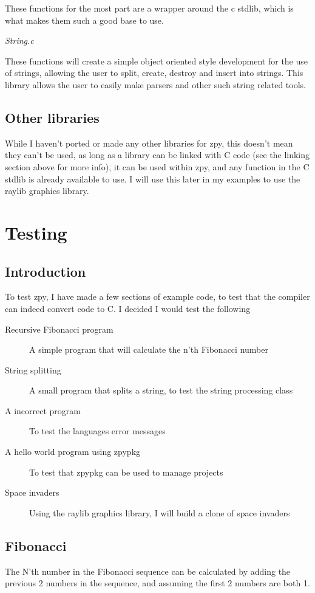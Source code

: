 \documentclass[a4paper,12pt]{article}
\begin{document}
{These functions for the most part are a wrapper around the c stdlib, which is what makes them such a good base to use.


\textit{String.c}

These functions will create a simple object oriented style development for the use of strings, allowing the user to split, create,
destroy and insert into strings. This library allows the user to easily make parsers and other such string related tools.

\subsection{Other libraries}
While I haven't ported or made any other libraries for zpy, this doesn't mean they can't be used, as long as a library can be linked
with C code (see the linking section above for more info), it can be used within zpy, and any function in the C stdlib is already
available to use. I will use this later in my examples to use the raylib graphics library.

\section{Testing}
\subsection{Introduction}
To test zpy, I have made a few sections of example code, to test that the compiler can indeed convert code to C. I decided I would
test the following
\begin{description}
	\item[Recursive Fibonacci program] A simple program that will calculate the n'th Fibonacci number
	\item[String splitting] A small program that splits a string, to test the string processing class
	\item[A incorrect program] To test the languages error messages
	\item[A hello world program using zpypkg] To test that zpypkg can be used to manage projects
	\item[Space invaders] Using the raylib graphics library, I will build a clone of space invaders
\end{description}
\subsection{Fibonacci}
The N'th number in the  Fibonacci sequence can be calculated by adding the previous 2 numbers in the sequence, and assuming the first 
2 numbers are both 1.

}
\end{document}
